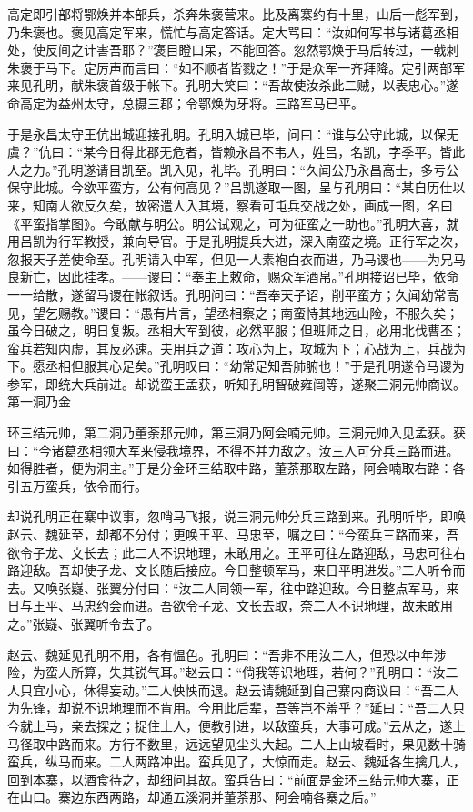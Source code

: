 高定即引部将鄂焕并本部兵，杀奔朱褒营来。比及离寨约有十里，山后一彪军到，乃朱褒也。褒见高定军来，慌忙与高定答话。定大骂曰：“汝如何写书与诸葛丞相处，使反间之计害吾耶？”褒目瞪口呆，不能回答。忽然鄂焕于马后转过，一戟刺朱褒于马下。定厉声而言曰：“如不顺者皆戮之！”于是众军一齐拜降。定引两部军来见孔明，献朱褒首级于帐下。孔明大笑曰：“吾故使汝杀此二贼，以表忠心。”遂命高定为益州太守，总摄三郡；令鄂焕为牙将。三路军马已平。

于是永昌太守王伉出城迎接孔明。孔明入城已毕，问曰：“谁与公守此城，以保无虞？”伉曰：“某今日得此郡无危者，皆赖永昌不韦人，姓吕，名凯，字季平。皆此人之力。”孔明遂请目凯至。凯入见，礼毕。孔明曰：“久闻公乃永昌高士，多亏公保守此城。今欲平蛮方，公有何高见？”吕凯遂取一图，呈与孔明曰：“某自历仕以来，知南人欲反久矣，故密遣人入其境，察看可屯兵交战之处，画成一图，名曰《平蛮指掌图》。今敢献与明公。明公试观之，可为征蛮之一助也。”孔明大喜，就用吕凯为行军教授，兼向导官。于是孔明提兵大进，深入南蛮之境。正行军之次，忽报天子差使命至。孔明请入中军，但见一人素袍白衣而进，乃马谡也——为兄马良新亡，因此挂孝。——谡曰：“奉主上敕命，赐众军酒帛。”孔明接诏已毕，依命一一给散，遂留马谡在帐叙话。孔明问曰：“吾奉天子诏，削平蛮方；久闻幼常高见，望乞赐教。”谡曰：“愚有片言，望丞相察之；南蛮恃其地远山险，不服久矣；虽今日破之，明日复叛。丞相大军到彼，必然平服；但班师之日，必用北伐曹丕；蛮兵若知内虚，其反必速。夫用兵之道：攻心为上，攻城为下；心战为上，兵战为下。愿丞相但服其心足矣。”孔明叹曰：“幼常足知吾肺腑也！”于是孔明遂令马谡为参军，即统大兵前进。却说蛮王孟获，听知孔明智破雍闿等，遂聚三洞元帅商议。第一洞乃金

环三结元帅，第二洞乃董荼那元帅，第三洞乃阿会喃元帅。三洞元帅入见孟获。获曰：“今诸葛丞相领大军来侵我境界，不得不并力敌之。汝三人可分兵三路而进。如得胜者，便为洞主。”于是分金环三结取中路，董荼那取左路，阿会喃取右路：各引五万蛮兵，依令而行。

却说孔明正在寨中议事，忽哨马飞报，说三洞元帅分兵三路到来。孔明听毕，即唤赵云、魏延至，却都不分付；更唤王平、马忠至，嘱之曰：“今蛮兵三路而来，吾欲令子龙、文长去；此二人不识地理，未敢用之。王平可往左路迎敌，马忠可往右路迎敌。吾却使子龙、文长随后接应。今日整顿军马，来日平明进发。”二人听令而去。又唤张嶷、张翼分付曰：“汝二人同领一军，往中路迎敌。今日整点军马，来日与王平、马忠约会而进。吾欲令子龙、文长去取，奈二人不识地理，故未敢用之。”张嶷、张翼听令去了。

赵云、魏延见孔明不用，各有愠色。孔明曰：“吾非不用汝二人，但恐以中年涉险，为蛮人所算，失其锐气耳。”赵云曰：“倘我等识地理，若何？”孔明曰：“汝二人只宜小心，休得妄动。”二人怏怏而退。赵云请魏延到自己寨内商议曰：“吾二人为先锋，却说不识地理而不肯用。今用此后辈，吾等岂不羞乎？”延曰：“吾二人只今就上马，亲去探之；捉住土人，便教引进，以敌蛮兵，大事可成。”云从之，遂上马径取中路而来。方行不数里，远远望见尘头大起。二人上山坡看时，果见数十骑蛮兵，纵马而来。二人两路冲出。蛮兵见了，大惊而走。赵云、魏延各生擒几人，回到本寨，以酒食待之，却细问其故。蛮兵告曰：“前面是金环三结元帅大寨，正在山口。寨边东西两路，却通五溪洞并董荼那、阿会喃各寨之后。”

